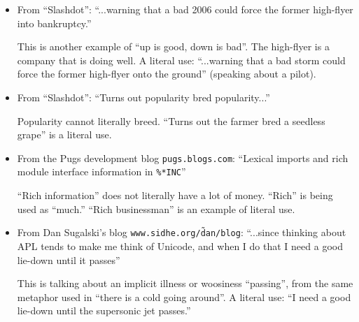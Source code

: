 \documentclass[12pt]{article}
\begin{document}
\begin{itemize}
\item From ``Slashdot'': ``...warning that a bad 2006 could force the
former high-flyer into bankruptcy.''

This is another example of ``up is good, down is bad''.  The high-flyer
is a company that is doing well.  A literal use: ``...warning that a bad
storm could force the former high-flyer onto the ground'' (speaking
about a pilot).

\item From ``Slashdot'': ``Turns out popularity bred popularity...''

Popularity cannot literally breed.  ``Turns out the farmer bred a
seedless grape'' is a literal use.

\item From the Pugs development blog \texttt{pugs.blogs.com}: ``Lexical
imports and rich module interface information in \texttt{\%*INC}''

``Rich information'' does not literally have a lot of money.  ``Rich''
is being used as ``much.''  ``Rich businessman'' is an example of
literal use.

\item From Dan Sugalski's blog \texttt{www.sidhe.org/\~dan/blog}:
``...since thinking about APL tends to make me think of Unicode, and
when I do that I need a good lie-down until it passes''

This is talking about an implicit illness or woosiness ``passing'', from
the same metaphor used in ``there is a cold going around''.  A literal
use: ``I need a good lie-down until the supersonic jet passes.''

\end{itemize}
\end{document}
